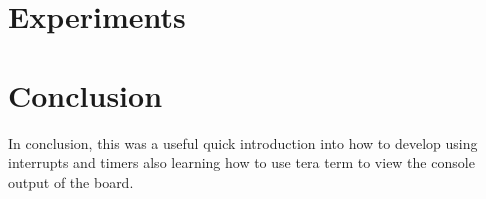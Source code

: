 \documentclass[a4paper,12pt]{scrartcl}
\begin{document}
	\section{Experiments}
	{
		
	}

	\section{Conclusion}
	{
		In conclusion, this was a useful quick introduction into how to develop using interrupts and timers also learning how to use tera term to view the console output of the board.
	}
	
	\newpage
	
	\printbibliography[heading=bibintoc,title=References]
\end{document}
